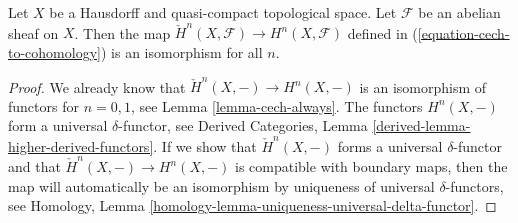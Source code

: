 %
\begin{lemma}
\label{lemma-cech-Hausdorff-quasi-compact}
Let $X$ be a Hausdorff and quasi-compact topological space. Let
$\mathcal{F}$ be an abelian sheaf on $X$. Then
the map $\check{H}^n(X, \mathcal{F}) \to H^n(X, \mathcal{F})$ defined
in (\ref{equation-cech-to-cohomology}) is an isomorphism for
all $n$.
\end{lemma}

\begin{proof}
We already know that $\check{H}^n(X, -) \to H^n(X, -)$
is an isomorphism of functors for $n = 0, 1$, see
Lemma \ref{lemma-cech-always}.
The functors $H^n(X, -)$ form a universal $\delta$-functor, see
Derived Categories, Lemma \ref{derived-lemma-higher-derived-functors}.
If we show that $\check{H}^n(X, -)$ forms a universal $\delta$-functor
and that $\check{H}^n(X, -) \to H^n(X, -)$ is compatible with boundary
maps, then the map will automatically be an isomorphism by uniqueness
of universal $\delta$-functors, see
Homology, Lemma \ref{homology-lemma-uniqueness-universal-delta-functor}.


\end{proof}
